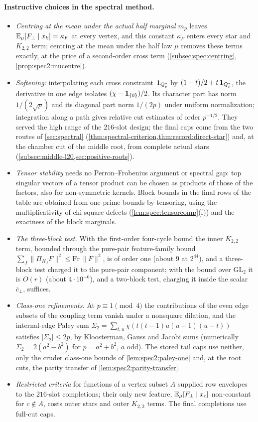 \paragraph{Instructive choices in the spectral method.}
\begin{itemize}
\item \emph{Centring at the mean under the actual half marginal $m_p$} leaves
 $\mathbb E_\mu[F_\perp\mid x_k]=\kappa_F$ at every vertex, and this constant $\kappa_F$ enters every star and $K_{2,2}$ term; centring at the mean under the half law
 $\mu$ removes these terms exactly, at the price of a second-order cross term
 (\cref{subsec:spec:centring}, \cref{prop:spec2:mucentre}).
\item \emph{Softening:} interpolating each cross constraint
 $\mathbf 1_{Q_{p}^{*}}$ by $(1-t)/2+t\,\mathbf 1_{Q_{p}^{*}}$, the derivative in one edge
 isolates $(\chi-\mathbf 1_{\{0\}})/2$. Its character part has norm $1/(2\sqrt p)$ and its diagonal part norm $1/(2p)$ under uniform normalization; integration
 along a path gives relative cut estimates of order $p^{-1/2}$. They served the
 high range of the $216$-slot design; the final caps come from the two routes of
 \cref{sec:spectral} (\cref{thm:spectral-criterion,thm:record:direct-star}) and,
 at the chamber cut of the middle root, from complete actual stars
 (\cref{subsec:middle-l20,sec:positive-roots}).
\item \emph{Tensor stability} needs no Perron--Frobenius argument or spectral
 gap: top singular vectors of a tensor product can be chosen as products of those of the
 factors, also for non-symmetric kernels. Block bounds in the
 final rows of the table are obtained from one-prime bounds by
 tensoring, using the multiplicativity of chi-square defects
 (\cref{lem:spec:tensorcomp}(f)) and the exactness of the block
 marginals.
\item \emph{The three-block test.} With the first-order four-cycle bound the
 inner $K_{2,2}$ term, bounded through the pure-pair feature-family bound
 $\sum_J\|\Pi_{H_J}F\|^2\le\mathrm{Fr}\,\|F\|^2$, is of order one (about $9$ at
 $2^{44}$), and a three-block test charged it to the pure-pair component; with
 the bound over
 $\mathrm{GL}_2$ it is $O(r)$ (about $4\cdot10^{-6}$), and a two-block test,
 charging it inside the scalar $\bar c_\perp$, suffices.
\item \emph{Class-one refinements.} At $p\equiv1\pmod4$ the contributions of the even edge subsets of the coupling term vanish under a nonsquare dilation, and the internal-edge Paley
 sum $\Sigma_2=\sum_{t,u}\chi(t(t-1)u(u-1)(u-t))$ satisfies $|\Sigma_2|\le2p$, by
 Kloosterman, Gauss and Jacobi sums (numerically $\Sigma_2=2(a^2-b^2)$ for
 $p=a^2+b^2$, $a$ odd). The stored tail caps use neither, only the cruder
 class-one bounds of \cref{lem:spec2:paley-one} and, at the root cuts, the
 parity transfer of \cref{lem:spec2:parity-transfer}.
\item \emph{Restricted criteria} for functions of a vertex subset $A$ supplied
 row envelopes to the $216$-slot completions; their only new feature,
 $\mathbb E_\mu[F_\perp\mid x_c]$ non-constant for $c\notin A$, costs outer stars and
 outer $K_{2,2}$ terms. The final completions use full-cut caps.
\end{itemize}

